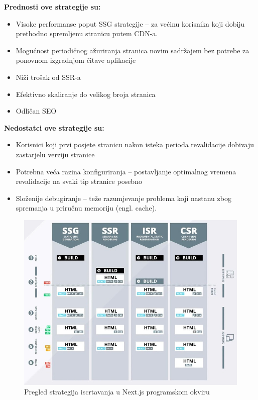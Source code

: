 \bigskip

\textbf{Prednosti ove strategije su:}
\begin{itemize}
    \item Visoke performanse poput SSG strategije – za većinu korisnika koji dobiju prethodno spremljenu stranicu putem CDN-a.
    \item Mogućnost periodičnog ažuriranja stranica novim sadržajem bez potrebe za ponovnom izgradnjom čitave aplikacije
    \item Niži trošak od SSR-a
    \item Efektivno skaliranje do velikog broja stranica
    \item Odličan SEO
\end{itemize}

\bigskip

\textbf{Nedostatci ove strategije su:}

\begin{itemize}
    \item Korisnici koji prvi posjete stranicu nakon isteka perioda revalidacije dobivaju zastarjelu verziju stranice
    \item Potrebna veća razina konfiguriranja – postavljanje optimalnog vremena revalidacije na svaki tip stranice posebno
    \item Složenije debugiranje – teže razumjevanje problema koji nastanu zbog spremanja u priručnu memoriju (engl. cache). \cite{flaws2021isr}
\end{itemize}


\begin{figure}[H]
    \centering
    \includegraphics[width=\textwidth]{slike/pregled-strategija-iscrtavanja.jpg}
    \caption{Pregled strategija iscrtavanja u Next.js programskom okviru}
    \label{fig:pregled-strategija-iscrtavanja}
\end{figure}

